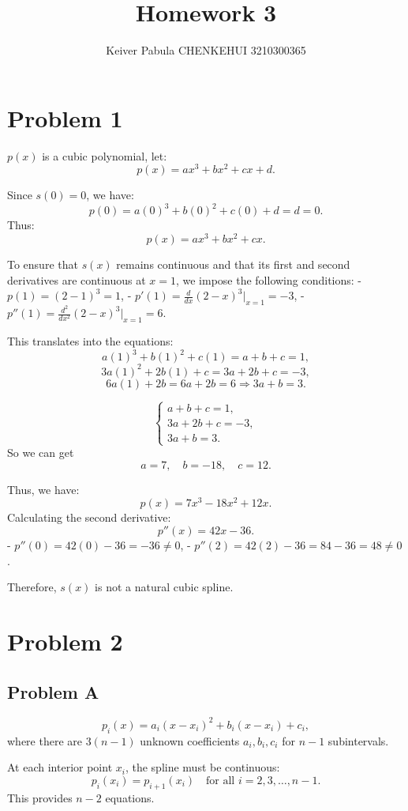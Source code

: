 \documentclass{article}
\title{Homework 3}
\author{Keiver Pabula CHENKEHUI 3210300365}
\begin{document}
\maketitle


\section{Problem 1}
\( p(x) \) is a cubic polynomial, let:
\[
p(x) = a x^3 + b x^2 + c x + d.
\]

Since \( s(0) = 0 \), we have:
\[
p(0) = a(0)^3 + b(0)^2 + c(0) + d = d = 0.
\]
Thus:
\[
p(x) = a x^3 + b x^2 + c x.
\]

To ensure that \( s(x) \) remains continuous and that its first and second derivatives are continuous at \( x = 1 \), we impose the following conditions:
- \( p(1) = (2 - 1)^3 = 1 \),
- \( p'(1) = \frac{d}{dx} (2 - x)^3 \Big|_{x=1} = -3 \),
- \( p''(1) = \frac{d^2}{dx^2} (2 - x)^3 \Big|_{x=1} = 6 \).

This translates into the equations:
\[
a(1)^3 + b(1)^2 + c(1) = a + b + c = 1,
\]
\[
3a(1)^2 + 2b(1) + c = 3a + 2b + c = -3,
\]
\[
6a(1) + 2b = 6a + 2b = 6 \Rightarrow 3a + b = 3.
\]

\[
\begin{cases}
a + b + c = 1, \\
3a + 2b + c = -3, \\
3a + b = 3.
\end{cases}
\]
So we can get
\[
a = 7, \quad b = -18, \quad c = 12.
\]

Thus, we have:
\[
p(x) = 7x^3 - 18x^2 + 12x.
\]
Calculating the second derivative:
\[
p''(x) = 42x - 36.
\]
- \( p''(0) = 42(0) - 36 = -36 \neq 0 \),
- \( p''(2) = 42(2) - 36 = 84 - 36 = 48 \neq 0 \).

Therefore, \( s(x) \) is not a natural cubic spline.


\section{Problem 2}
\subsection{Problem A}
\[
p_i(x) = a_i (x - x_i)^2 + b_i (x - x_i) + c_i,
\]
where there are \( 3(n - 1) \) unknown coefficients \( a_i, b_i, c_i \) for \( n - 1 \) subintervals.

At each interior point \( x_i \), the spline must be continuous:
   \[
   p_i(x_i) = p_{i+1}(x_i) \quad \text{for all } i = 2, 3, \dots, n - 1.
   \]
   This provides \( n - 2 \) equations.
\end{document}
